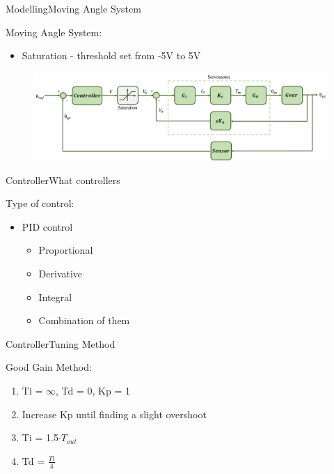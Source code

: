 \begin{frame}{Modelling}{Moving Angle System}
  \begin{block}{Moving Angle System:}

	  \begin{itemize}
	  	\item Saturation - threshold set from -5V to 5V
	  \end{itemize}

	  \begin{figure}
        \includegraphics[scale=0.24]{../report/figures/servo+gear+noise+saturation.png}
      \end{figure}

  \end{block}
\end{frame}


\begin{frame}{Controller}{What controllers}
  \begin{block}{Type of control:}

	  \begin{itemize}
	  	\item PID control
	 	\begin{itemize}
	  	\item Proportional
	  	\item Derivative
	  	\item Integral
	  	\item Combination of them
	  \end{itemize}
	  \end{itemize}


  \end{block}
\end{frame}

\begin{frame}{Controller}{Tuning Method}
  \begin{block}{Good Gain Method:}
	  \begin{enumerate}
	  	\item Ti = $\infty$, Td = 0, Kp = 1
	  	\item Increase Kp until finding a slight overshoot
		\item Ti = 1.5$\cdot T_{out}$
		\item Td = $\frac{Ti}{4}$
	  \end{enumerate}
	  
  \end{block}
\end{frame}

